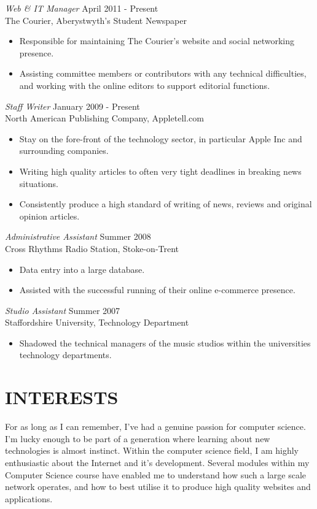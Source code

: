 \documentclass[line,margin]{res}
\begin{document}
\begin{resume}
	{\sl Web \& IT Manager} \hfill April 2011 - Present \\
	The Courier, Aberystwyth's Student Newspaper
	\begin{itemize} \itemsep -2pt
	\item Responsible for maintaining The Courier's website and social networking presence.
	\item Assisting committee members or contributors with any technical difficulties, and working with the online editors to support editorial functions.
	\end{itemize}


	       {\sl Staff Writer} \hfill January 2009 - Present \\
                North American Publishing Company, Appletell.com
                 \begin{itemize}  \itemsep -2pt %
                 \item Stay on the fore-front of the technology sector, in particular Apple Inc and surrounding companies.
	       \item Writing high quality articles to often very tight deadlines in breaking news situations.
	       \item Consistently produce a high standard of writing of news, reviews and original opinion articles.
                \end{itemize}
 
                {\sl Administrative Assistant} \hfill            Summer 2008 \\
                Cross Rhythms Radio Station, Stoke-on-Trent
                 \begin{itemize}  \itemsep -2pt %
                 \item Data entry into a large database.
	        \item Assisted with the successful running of their online e-commerce presence.
                 \end{itemize} 

	{\sl Studio Assistant} \hfill Summer 2007 \\
	Staffordshire University, Technology Department
	\begin{itemize} \itemsep -2pt
	\item Shadowed the technical managers of the music studios within the universities technology departments.
	\end{itemize}
        

\section{INTERESTS}             
           For as long as I can remember, I've had a genuine passion for computer science. I'm lucky
enough to be part of a generation where learning about new technologies is almost
instinct. Within the computer science field, I am highly enthusiastic about the Internet
and it's development. Several modules within my Computer Science course have enabled me to
understand how such a large scale network operates, and how to best utilise it to produce
high quality websites and applications.


\end{resume}
\end{document}

